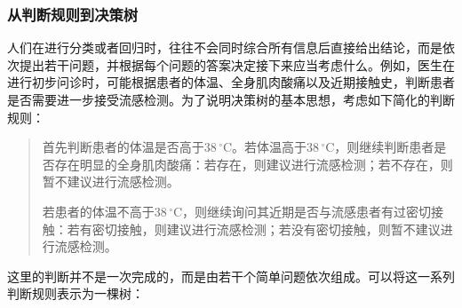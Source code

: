 \subsubsection{从判断规则到决策树}
人们在进行分类或者回归时，往往不会同时综合所有信息后直接给出结论，而是依次提出若干问题，并根据每个问题的答案决定接下来应当考虑什么。例如，医生在进行初步问诊时，可能根据患者的体温、全身肌肉酸痛以及近期接触史，判断患者是否需要进一步接受流感检测。为了说明决策树的基本思想，考虑如下简化的判断规则：
\begin{quote}
	首先判断患者的体温是否高于$38\,^\circ\mathrm{C}$。若体温高于$38\,^\circ\mathrm{C}$，则继续判断患者是否存在明显的全身肌肉酸痛：若存在，则建议进行流感检测；若不存在，则暂不建议进行流感检测。\par
	若患者的体温不高于$38\,^\circ\mathrm{C}$，则继续询问其近期是否与流感患者有过密切接触：若有密切接触，则建议进行流感检测；若没有密切接触，则暂不建议进行流感检测。
\end{quote}
这里的判断并不是一次完成的，而是由若干个简单问题依次组成。可以将这一系列判断规则表示为一棵树：
